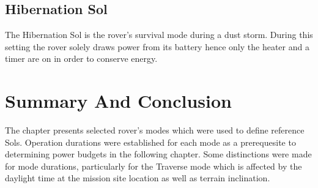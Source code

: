 

\subsection{Hibernation Sol}
\label{sec:ReferenceSols:HibernationSol}
The Hibernation Sol is the rover's survival mode during a dust storm. During this setting the rover solely draws power from its battery hence only the heater and a timer are on in order to conserve energy.



\section{Summary And Conclusion}
\label{sec:ReferenceSols:SummaryAndConclusion}
The chapter presents selected rover's modes which were used to define reference Sols. Operation durations were established for each mode as a prerequesite to determining power budgets in the following chapter. Some distinctions were made for mode durations, particularly for the Traverse mode which is affected by the daylight time at the mission site location as well as terrain inclination.
